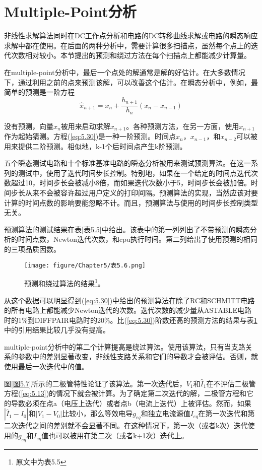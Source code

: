 \section{Multiple-Point分析}
非线性求解算法同时在DC工作点分析和电路的DC转移曲线求解或电路的瞬态响应求解中都在使用。在后面的两种分析中，需要计算很多扫描点，虽然每个点上的迭代次数相对较小。本节提出的预测和绕过方法在每个扫描点上都能减少计算量。

在multiple-point分析中，最后一个点处的解通常是解的好估计。在大多数情况下，通过利用之前的点来预测该解，可以改善这个估计。在瞬态分析中，例如，最简单的预测是一阶方程
\begin{equation}
    \hat{x}_{n+1} = x_n + \frac{h_{n+1}}{h_n}(x_n-x_{n-1})
    \label{eq:5.30}
\end{equation}

没有预测，向量$x_n$被用来启动求解$x_{n+1}$。各种预测方法，在另一方面，使用$x_{n+1}$作为起始猜测。方程(\ref{eq:5.30})是一种一阶预测。时间点$x_n$，$x_{n-1}$，和$x_{n-2}$可以被用来提供二阶预测。相似地，k-1个后时间点产生k阶预测。

五个瞬态测试电路和十个标准基准电路的瞬态分析被用来测试预测算法。在这一系列的测试中，使用了迭代时间步长控制。特别地，如果在一个给定的时间点迭代次数超过10，时间步长会被减小8倍，而如果迭代次数小于5，时间步长会被加倍。时间步长从来不会被容许超过用户定义的打印间隔。预测算法的实现，当然应该对要计算的时间点数的影响要能忽略不计。而且，预测算法与使用的时间步长控制类型无关。

预测算法的测试结果在表\ref{表5.5}中给出。该表中的第一列列出了不带预测的瞬态分析的时间点数，Newton迭代次数，和cpu执行时间。第二列给出了使用预测的相同的三项品质因数。

\begin{figure}[htbp]
\small
    \centering
    \texttt{[image: figure/Chapter5/表5.6.png]}
    \caption{预测和绕过算法的结果\footnote{原文中为表5.5}。}
    \label{表5.6}
\end{figure}

从这个数据可以明显得到(\ref{eq:5.30})中给出的预测算法在除了RC和SCHMITT电路的所有电路上都能减少Newton迭代的次数。迭代次数的减少量从ASTABLE电路时的1\%到DIFFPAIR电路时的20\%。比(\ref{eq:5.30})阶数还高的预测方法的结果与表\ref{表5.6}中的引用结果比较几乎没有提高。

multiple-point分析中的第二个计算提高是绕过算法。使用该算法，只有当支路关系的参数中的差别显著改变，非线性支路关系和它们的导数才会被评估。否则，就使用最后一次迭代中的值\cite{ref-62}。

图\ref{图5.7}所示的二极管特性论证了该算法。第一次迭代后，$V_1$和$\hat{I}_1$在不评估二极管方程(\ref{eq:5.13})的情况下就会被计算。为了确定第二次迭代的解，二极管方程和它的导数必须在点a（电压上迭代）或者点b（电流上迭代）上被评估。然而，如果$|\hat{I}_1 - I_0|$和$|V_1 - V_0|$比较小，那么等效电导$g_{eq}$和独立电流源值$I_{eq}$在第一次迭代和第二次迭代之间的差别就不会显著不同。在这种情况下，第一次（或者k次）迭代使用的$g_{eq}$和$I_{eq}$值也可以被用在第二次（或者k+1次）迭代上。

